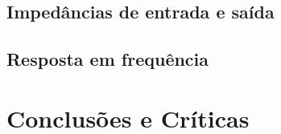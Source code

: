 \documentclass[%
  reprint,
  nofootinbib,
  amsmath,amssymb,
  aps,
  10pt,
  a4paper
]{revtex4-1}
\begin{document}
\subsection{Impedâncias de entrada e saída}
\subsection{Resposta em frequência}


\section{Conclusões e Críticas}
\label{s:conclu}




\nocite{*}
{}
\end{document}
